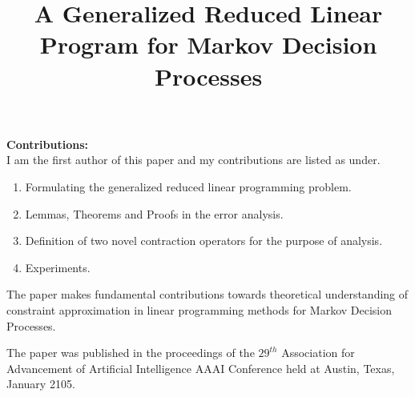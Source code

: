 \documentclass[8pt]{article}
\title{A Generalized Reduced Linear Program for Markov Decision Processes}
\author{}
\date{}
\begin{document}
\maketitle
\textbf{Contributions:}\\
I am the first author of this paper and my contributions are listed as under.
\begin{enumerate}
\item Formulating the generalized reduced linear programming problem.
\item Lemmas, Theorems and Proofs in the error analysis.
\item Definition of two novel contraction operators for the purpose of analysis.
\item Experiments.
\end{enumerate}
The paper makes fundamental contributions towards theoretical understanding of constraint approximation in linear programming methods for Markov Decision Processes.\par
The paper was published in the proceedings of the $29^{th}$ Association for Advancement of Artificial Intelligence AAAI Conference held at Austin, Texas, January 2105.

\end{document}
